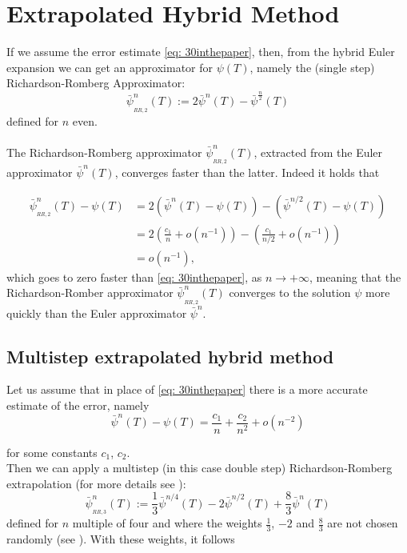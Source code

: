 \documentclass[a4paper,italian,11pt]{book}
\theoremstyle{plain}
\theoremstyle{remark}
\theoremstyle{plain}
\begin{document}
\section{Extrapolated Hybrid Method}
\label{section: extrapolatedhyb}
If we assume the error estimate \eqref{eq: 30inthepaper}, then, from the hybrid Euler expansion we can get an approximator for $\psi(T)$, namely the 
(single step) Richardson-Romberg Approximator:
\begin{equation}
    \label{eq: RR.1}
    \bar{\psi}^n_{_{RR,2}}(T) := 2 \bar{\psi}^n(T) - \bar{\psi}^{\frac{n}{2}}(T)
\end{equation}
defined for $n$ even.
\\\
\\
The Richardson-Romberg approximator $\bar{\psi}^n_{_{RR,2}}(T)$, extracted from the Euler approximator $\bar{\psi}^n(T)$, converges faster than the latter. Indeed it holds that

\begin{equation*}
    \begin{aligned}
    \bar{\psi}^n_{_{RR,2}}(T) - \psi(T) &= 2\left( \bar{\psi}^n(T) - \psi(T) \right) - \left( \bar{\psi}^{n/2}(T) - \psi(T) \right) \\
    &= 2\left( \frac{c_1}{n} + o(n^{-1}) \right) - \left( \frac{c_1}{n/2} +o(n^{-1}) \right) 
    \\
    &= o(n^{-1}),
    \end{aligned}
\end{equation*}
which goes to zero faster than \eqref{eq: 30inthepaper}, as $n\to +\infty$, meaning that the Richardson-Romber approximator $\bar{\psi}^n_{_{RR,2}}(T)$ converges to the solution $\psi$ more quickly than the Euler approximator $\bar{\psi}^n$.

\subsection{Multistep extrapolated hybrid method}
\label{subsection: multiStepRR}

Let us assume that in place of \eqref{eq: 30inthepaper} there is a more accurate estimate of the error, namely
\begin{equation}
    \label{eq: moreAccurateEstimate}
    \bar{\psi}^n(T)-\psi(T) = \frac{c_1}{n} + \frac{c_2}{n^2} + o(n^{-2})
\end{equation}

for some constants $c_1$, $c_2$. \\
Then we can apply a multistep (in this case double step) Richardson-Romberg extrapolation (for more details see \cite{RR3extr}):
\begin{equation}
    \label{eq: multiStepRR}
    \bar{\psi}^n_{_{RR,3}}(T) := \frac{1}{3} \bar{\psi}^{n/4}(T) - 2 \bar{\psi}^{n/2}(T) + \frac{8}{3}\bar{\psi}^n(T)
\end{equation}
defined for $n$ multiple of four and 
where the weights $\frac{1}{3}$, $-2$ and $\frac{8}{3}$ are not chosen randomly (see \cite{RR3extr}). With these weights, it follows
\end{document}
